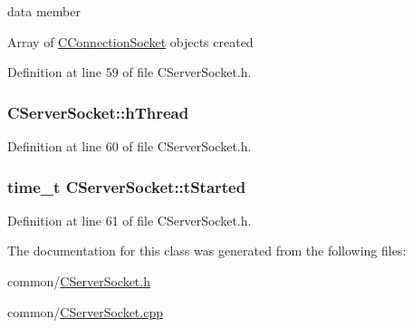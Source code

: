 data member 

\-Array of \hyperlink{class_c_connection_socket}{\-C\-Connection\-Socket} objects created 

\-Definition at line 59 of file \-C\-Server\-Socket.\-h.

\hypertarget{class_c_server_socket_ab42e0206af0388d76aafa6ea9a5e8038}{
\subsubsection[{h\-Thread}]{ {\bf \-C\-Server\-Socket\-::h\-Thread}}}\label{class_c_server_socket_ab42e0206af0388d76aafa6ea9a5e8038}


\-Definition at line 60 of file \-C\-Server\-Socket.\-h.

\hypertarget{class_c_server_socket_afb05d7651f4d59fdb791e1356721b764}{
\subsubsection[{t\-Started}]{\setlength{\rightskip}{0pt plus 5cm}time\-\_\-t {\bf \-C\-Server\-Socket\-::t\-Started}}}\label{class_c_server_socket_afb05d7651f4d59fdb791e1356721b764}


\-Definition at line 61 of file \-C\-Server\-Socket.\-h.



\-The documentation for this class was generated from the following files\-:\begin{DoxyCompactItemize}
\item 
common/\hyperlink{_c_server_socket_8h}{\-C\-Server\-Socket.\-h}\item 
common/\hyperlink{_c_server_socket_8cpp}{\-C\-Server\-Socket.\-cpp}\end{DoxyCompactItemize}
